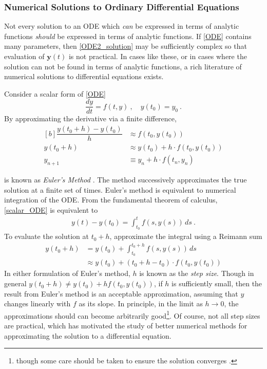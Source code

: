 \subsubsection{Numerical Solutions to Ordinary Differential Equations}

Not every solution to an ODE which \textit{can} be expressed in terms of analytic functions \textit{should} be expressed in terms of analytic functions. If \cref{ODE} contains many parameters, then \cref{ODE2_solution} may be sufficiently complex so that evaluation of $\mathbf{y}(t)$ is not practical.  In cases like these, or in cases where the solution can not be found in terms of analytic functions, a rich literature of numerical solutions to differential equations exists.

Consider a scalar form of \cref{ODE}
%
\begin{equation}\label{scalar_ODE}
	\dfrac{dy}{dt} = f(t,y) \>, \quad y(t_0) = y_0 \>.
\end{equation}
%
By approximating the derivative via a finite difference,
%
\begin{equation}\label{EuerlMethod}
\begin{aligned}[b]
\dfrac{y(t_0 + h) - y(t_0)}{h} &\approx f(t_0,y(t_0)) \\
y(t_0+h) &\approx y(t_0) + h\cdot f(t_0, y(t_0))\\
y_{n+1} & \equiv y_{n}+ h \cdot f(t_n,y_n)
\end{aligned}
\end{equation}

 is known as \textit{Euler's Method} \cite{boyce2012differential}.  The method successively approximates the true solution at a finite set of times. Euler's method is equivalent to numerical integration of the ODE.  From the fundamental theorem of calculus, \cref{scalar_ODE} is equivalent to
%
\begin{align*}
	y(t) - y(t_0) = \int_{t_0}^t f(s,y(s)) \, ds \>.
\end{align*}
%
To evaluate the solution at $ t_0+h $, approximate the integral using a Reimann sum
%
\begin{equation}
\begin{aligned}
	y(t_0+h) &= y(t_0) + \int_{t_0}^{t_0+h}f(s,y(s)) \, ds \\
				  &\approx y(t_0) + (t_0 + h - t_0)\cdot f(t_0, y(t_0))
\end{aligned}
\end{equation}
In either formulation of Euler's method, $ h $ is known as the \textit{step size}. Though in general $ y(t_0+h) \neq y(t_0) + hf(t_0,y(t_0)) $, if $ h $ is sufficiently small, then the result from Euler's method is an acceptable approximation, assuming that $ y $ changes linearly with $ f $ as its slope. In principle, in the limit as $ h \rightarrow 0 $, the approximations should can become arbitrarily good\footnote{though some care should be taken to ensure the solution converges \cite{corless2013graduate}.}.  Of course, not all step sizes are practical, which has motivated the study of better numerical methods for approximating the solution to a differential equation.

